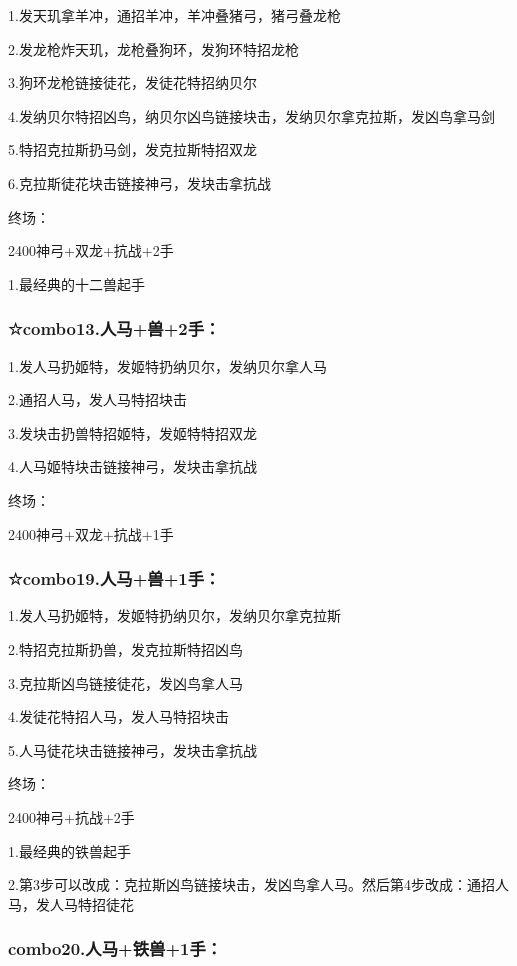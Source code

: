 \documentclass[
]{article}
\begin{document}
1.发天玑拿羊冲，通招羊冲，羊冲叠猪弓，猪弓叠龙枪

2.发龙枪炸天玑，龙枪叠狗环，发狗环特招龙枪

3.狗环龙枪链接徒花，发徒花特招纳贝尔

4.发纳贝尔特招凶鸟，纳贝尔凶鸟链接块击，发纳贝尔拿克拉斯，发凶鸟拿马剑

5.特招克拉斯扔马剑，发克拉斯特招双龙

6.克拉斯徒花块击链接神弓，发块击拿抗战

终场：

2400神弓+双龙+抗战+2手

1.最经典的十二兽起手

\hypertarget{combo13.ux4ebaux9a6cux517d2ux624b}{%
\subsubsection{☆combo13.人马+兽+2手：}\label{combo13.ux4ebaux9a6cux517d2ux624b}}

1.发人马扔姬特，发姬特扔纳贝尔，发纳贝尔拿人马

2.通招人马，发人马特招块击

3.发块击扔兽特招姬特，发姬特特招双龙

4.人马姬特块击链接神弓，发块击拿抗战

终场：

2400神弓+双龙+抗战+1手

\hypertarget{combo19.ux4ebaux9a6cux517d1ux624b}{%
\subsubsection{☆combo19.人马+兽+1手：}\label{combo19.ux4ebaux9a6cux517d1ux624b}}

1.发人马扔姬特，发姬特扔纳贝尔，发纳贝尔拿克拉斯

2.特招克拉斯扔兽，发克拉斯特招凶鸟

3.克拉斯凶鸟链接徒花，发凶鸟拿人马

4.发徒花特招人马，发人马特招块击

5.人马徒花块击链接神弓，发块击拿抗战

终场：

2400神弓+抗战+2手

1.最经典的铁兽起手

2.第3步可以改成：克拉斯凶鸟链接块击，发凶鸟拿人马。然后第4步改成：通招人马，发人马特招徒花

\hypertarget{combo20.ux4ebaux9a6cux94c1ux517d1ux624b}{%
\subsubsection{combo20.人马+铁兽+1手：}\label{combo20.ux4ebaux9a6cux94c1ux517d1ux624b}}
\end{document}
